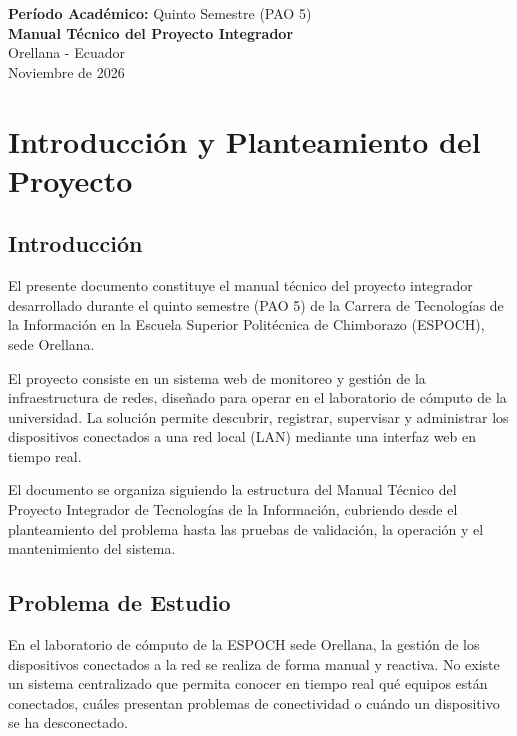 \documentclass[12pt,a4paper]{report}
\begin{document}
\begin{titlepage}
  \vfill

  {\small\textbf{Período Académico:} Quinto Semestre (PAO 5)}\\[0.05cm]
  {\small\textbf{Manual Técnico del Proyecto Integrador}}\\[0.6cm]

  {\small Orellana - Ecuador}\\[0.15cm]
  {\small Noviembre de 2026}
\end{titlepage}

\tableofcontents
\newpage
\listoffigures
\newpage
\listoftables
\newpage

\chapter{Introducción y Planteamiento del Proyecto}

\section{Introducción}

El presente documento constituye el manual técnico del proyecto integrador desarrollado durante el quinto semestre (PAO 5) de la Carrera de Tecnologías de la Información en la Escuela Superior Politécnica de Chimborazo (ESPOCH), sede Orellana.

El proyecto consiste en un sistema web de monitoreo y gestión de la infraestructura de redes, diseñado para operar en el laboratorio de cómputo de la universidad. La solución permite descubrir, registrar, supervisar y administrar los dispositivos conectados a una red local (LAN) mediante una interfaz web en tiempo real.

El documento se organiza siguiendo la estructura del Manual Técnico del Proyecto Integrador de Tecnologías de la Información, cubriendo desde el planteamiento del problema hasta las pruebas de validación, la operación y el mantenimiento del sistema.

\section{Problema de Estudio}

En el laboratorio de cómputo de la ESPOCH sede Orellana, la gestión de los dispositivos conectados a la red se realiza de forma manual y reactiva. No existe un sistema centralizado que permita conocer en tiempo real qué equipos están conectados, cuáles presentan problemas de conectividad o cuándo un dispositivo se ha desconectado.
\end{document}
